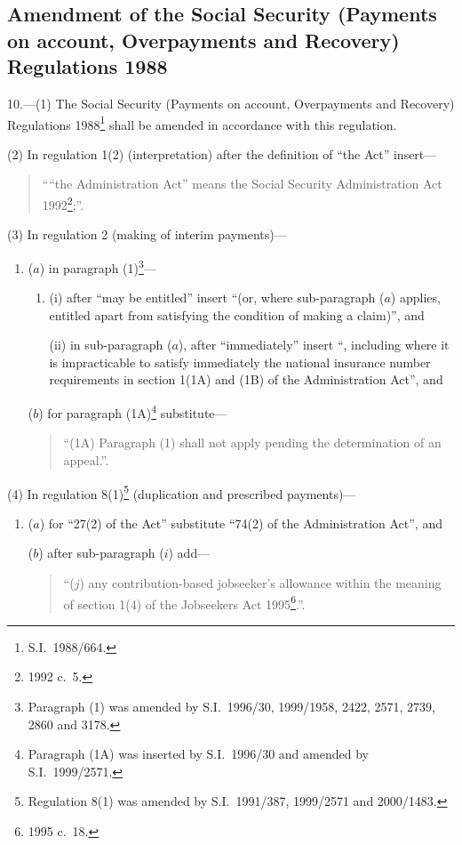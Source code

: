\documentclass[12pt,a4paper]{article}
\begin{document}
\subsection[10. Amendment of the Social Security (Payments on account, Overpayments and Recovery) Regulations 1988]{\sloppy Amendment of the Social Security (Payments on account, Overpayments and Recovery) Regulations 1988}

10.---(1)  The Social Security (Payments on account, Overpayments and Recovery) Regulations 1988\footnote{S.I.\ 1988/664.} shall be amended in accordance with this regulation.

(2) In regulation 1(2) (interpretation) after the definition of “the Act” insert—
\begin{quotation}
““the Administration Act” means the Social Security Administration Act 1992\footnote{1992 c.\ 5.};”.
\end{quotation}

(3) In regulation 2 (making of interim payments)—
\begin{enumerate}\item[]
($a$) in paragraph (1)\footnote{Paragraph (1) was amended by S.I.\ 1996/30, 1999/1958, 2422, 2571, 2739, 2860 and 3178.}—
\begin{enumerate}\item[]
(i) after “may be entitled” insert “(or, where sub-paragraph ($a$)  applies, entitled apart from satisfying the condition of making a claim)”, and

(ii) in sub-paragraph ($a$), after “immediately” insert “, including where it is impracticable to satisfy immediately the national insurance number requirements in section 1(1A) and (1B) of the Administration Act”, and
\end{enumerate}

($b$) for paragraph (1A)\footnote{Paragraph (1A) was inserted by S.I.\ 1996/30 and amended by S.I.\ 1999/2571.} substitute—
\begin{quotation}
“(1A) Paragraph (1) shall not apply pending the determination of an appeal.”.
\end{quotation}
\end{enumerate}

(4) In regulation 8(1)\footnote{Regulation 8(1) was amended by S.I.\ 1991/387, 1999/2571 and 2000/1483.} (duplication and prescribed payments)—
\begin{enumerate}\item[]
($a$) for “27(2) of the Act” substitute “74(2) of the Administration Act”, and

($b$) after sub-paragraph ($i$)  add—
\begin{quotation}
“($j$) any contribution-based jobseeker’s allowance within the meaning of section 1(4) of the Jobseekers Act 1995\footnote{1995 c.\ 18.}.”.
\end{quotation}
\end{enumerate}
\end{document}
